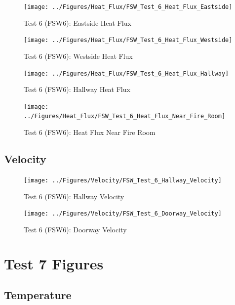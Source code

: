 \documentclass[12pt,oneside]{book}
\begin{document}
\begin{figure}[!ht]
	\texttt{[image: ../Figures/Heat\_Flux/FSW\_Test\_6\_Heat\_Flux\_Eastside]}
	\caption{Test 6 (FSW6): Eastside Heat Flux}
	\label{fig:Test_6_Eastside_Heat_Flux}
\end{figure}

\begin{figure}[!ht]
	\texttt{[image: ../Figures/Heat\_Flux/FSW\_Test\_6\_Heat\_Flux\_Westside]}
	\caption{Test 6 (FSW6): Westside Heat Flux}
	\label{fig:Test_6_Westside_Heat_Flux}
\end{figure}

\begin{figure}[!ht]
	\texttt{[image: ../Figures/Heat\_Flux/FSW\_Test\_6\_Heat\_Flux\_Hallway]}
	\caption{Test 6 (FSW6): Hallway Heat Flux}
	\label{fig:Test_6_Hallway_Heat_Flux}
\end{figure}

\begin{figure}[!ht]
	\texttt{[image: ../Figures/Heat\_Flux/FSW\_Test\_6\_Heat\_Flux\_Near\_Fire\_Room]}
	\caption{Test 6 (FSW6): Heat Flux Near Fire Room}
	\label{fig:Test_6_Heat_Flux_Near_Fire_Room}
\end{figure}

\subsection{Velocity}
\label{subsec:Velocity}

\begin{figure}[!ht]
	\texttt{[image: ../Figures/Velocity/FSW\_Test\_6\_Hallway\_Velocity]}
	\caption{Test 6 (FSW6): Hallway Velocity}
	\label{fig:Test_6_Hallway_Velocity}
\end{figure}

\begin{figure}[!ht]
	\texttt{[image: ../Figures/Velocity/FSW\_Test\_6\_Doorway\_Velocity]}
	\caption{Test 6 (FSW6): Doorway Velocity}
	\label{fig:Test_6_Doorway_Velocity}
\end{figure}

\clearpage

\section{Test 7 Figures}
\label{subsec:Test_7_Figures}

\subsection{Temperature}
\label{subsec:Temperature}
\end{document}
